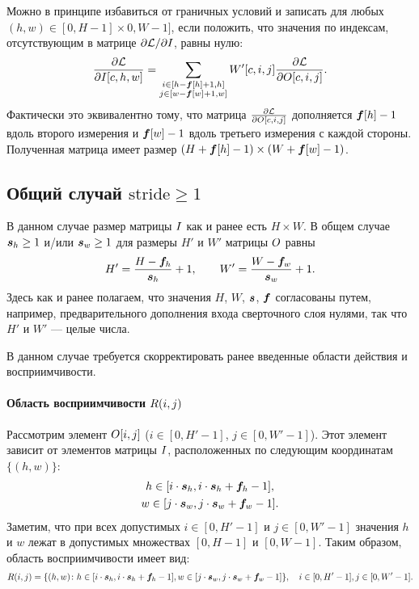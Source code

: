 \documentclass{book}
\numberwithin{theorem}{chapter}
\numberwithin{statement}{chapter}
\numberwithin{lemma}{chapter}
\theoremstyle{definition}
\numberwithin{task}{chapter}
\theoremstyle{remark}
\numberwithin{example}{chapter}
\theoremstyle{definition}
\numberwithin{definition}{chapter}
\theoremstyle{remark}
\theoremstyle{remark}
\numberwithin{lyrics}{section}
\begin{document}
Можно в принципе избавиться от граничных условий и записать для любых $(h, w) \in [0, H - 1] \times 0, W - 1]$, если положить, что значения по индексам, отсутствующим в матрице $\partial \mathcal{L} / \partial I$, равны нулю:
\begin{equation}
\frac{\partial \mathcal{L} }{\partial I[c, h, w]} = \sum\limits_{\substack{i \in [h - \boldsymbol{f}[h] + 1, h] \\ j \in [w - \boldsymbol{f}[w] + 1, w]}} W'[c, i, j] \frac{\partial \mathcal{L} }{\partial O[c, i, j]}.
\end{equation}
Фактически это эквивалентно тому, что матрица $\frac{\partial \mathcal{L} }{\partial O[c, i, j]}$ дополняется $\boldsymbol{f}[h] - 1$ вдоль второго измерения и $\boldsymbol{f}[w] - 1$ вдоль третьего измерения с каждой стороны. Полученная матрица имеет размер $(H + \boldsymbol{f}[h] - 1) \times (W + \boldsymbol{f}[w] - 1)$. 

\subsection{Общий случай $\text{stride} \ge 1$}
В данном случае размер матрицы $I$ как и ранее есть $H \times W$. В общем случае $\boldsymbol{s}_h \ge 1$ и/или $\boldsymbol{s}_w \ge 1$ для размеры $H' $ и $W'$ матрицы $O$ равны
\begin{equation}
H' = \frac{H - \boldsymbol{f}_h}{\boldsymbol{s}_h} + 1, \qquad W' = \frac{W - \boldsymbol{f}_w}{\boldsymbol{s}_w} + 1.
\end{equation}
Здесь как и ранее полагаем, что значения $H$, $W$, $\boldsymbol{s}$, $\boldsymbol{f}$ согласованы путем, например, предварительного дополнения входа сверточного слоя нулями, так что $H'$  и $W'$ --- целые числа.

В данном случае требуется скорректировать ранее введенные области действия и восприимчивости.

\paragraph{Область восприимчивости $R(i, j)$}
Рассмотрим элемент $O[i, j]$ ($i \in [0, H'- 1]$, $j \in [0, W' - 1]$). Этот элемент зависит от элементов матрицы $I$, расположенных по следующим координатам $\{(h, w)\}$:
\begin{gather*}
h \in [i \cdot \boldsymbol{s}_h, i \cdot \boldsymbol{s}_h + \boldsymbol{f}_h - 1], \\
w \in [j \cdot \boldsymbol{s}_w, j \cdot \boldsymbol{s}_w + \boldsymbol{f}_w - 1].
\end{gather*}
Заметим, что при всех допустимых $i \in [0, H'- 1]$ и $j \in [0, W' - 1]$ значения $h$ и $w$ лежат в допустимых множествах $[0, H - 1]$ и $[0, W - 1]$. Таким образом, область восприимчивости имеет вид:
\begin{equation}
R(i, j) = \{(h, w)\colon h \in [i \cdot \boldsymbol{s}_h, i \cdot \boldsymbol{s}_h + \boldsymbol{f}_h - 1], w \in [j \cdot \boldsymbol{s}_w, j \cdot \boldsymbol{s}_w + \boldsymbol{f}_w - 1]\}, \quad i \in [0, H'- 1], j \in [0, W' - 1].
\end{equation}
\end{document}
